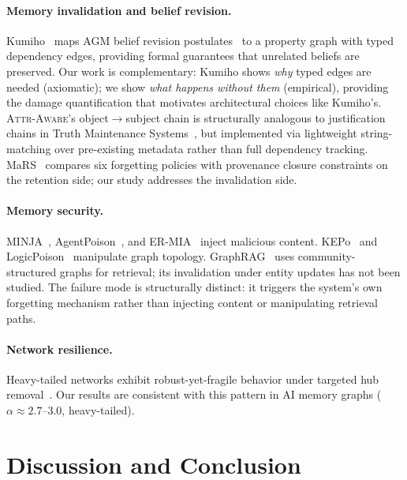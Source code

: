 \documentclass{article}
\newcommand{\attraware}{\textsc{Attr-Aware}}
\begin{document}
\paragraph{Memory invalidation and belief revision.}
Kumiho~\citep{kumiho_2026} maps AGM belief revision postulates~\citep{agm_1985} to a property graph with typed dependency edges, providing formal guarantees that unrelated beliefs are preserved.
Our work is complementary: Kumiho shows \textit{why} typed edges are needed (axiomatic); we show \textit{what happens without them} (empirical), providing the damage quantification that motivates architectural choices like Kumiho's.
\attraware{}'s object$\rightarrow$subject chain is structurally analogous to justification chains in Truth Maintenance Systems~\citep{doyle_tms_1979}, but implemented via lightweight string-matching over pre-existing metadata rather than full dependency tracking.
MaRS~\citep{mars_2025} compares six forgetting policies with provenance closure constraints on the retention side; our study addresses the invalidation side.

\paragraph{Memory security.}
MINJA~\citep{minja_2025}, AgentPoison~\citep{agentpoison_2024}, and ER-MIA~\citep{ermia_2026} inject malicious content.
KEPo~\citep{kepo_2026} and LogicPoison~\citep{logicpoison_2026} manipulate graph topology.
GraphRAG~\citep{edge_graphrag_2024} uses community-structured graphs for retrieval; its invalidation under entity updates has not been studied.
The failure mode is structurally distinct: it triggers the system's own forgetting mechanism rather than injecting content or manipulating retrieval paths.

\paragraph{Network resilience.}
Heavy-tailed networks exhibit robust-yet-fragile behavior under targeted hub removal~\citep{albert_attack_2000, cohen_percolation_2000}.
Our results are consistent with this pattern in AI memory graphs ($\alpha \approx 2.7$--$3.0$, heavy-tailed).


\section{Discussion and Conclusion}
\label{sec:conclusion}
\end{document}
